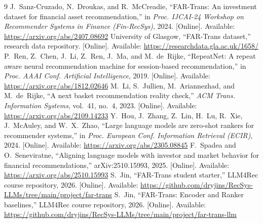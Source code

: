 \documentclass[conference]{IEEEtran}
\begin{document}
\begin{thebibliography}{9}
 J.~Sanz-Cruzado, N.~Droukas, and R.~McCreadie, ``FAR-Trans: An investment dataset for financial asset recommendation,'' in \emph{Proc. IJCAI-24 Workshop on Recommender Systems in Finance (Fin-RecSys)}, 2024. [Online]. Available: \url{https://arxiv.org/abs/2407.08692}
 University of Glasgow, ``FAR-Trans dataset,'' research data repository. [Online]. Available: \url{https://researchdata.gla.ac.uk/1658/}
 P.~Ren, Z.~Chen, J.~Li, Z.~Ren, J.~Ma, and M.~de~Rijke, ``RepeatNet: A repeat aware neural recommendation machine for session-based recommendation,'' in \emph{Proc. AAAI Conf. Artificial Intelligence}, 2019. [Online]. Available: \url{https://arxiv.org/abs/1812.02646}
 M.~Li, S.~Jullien, M.~Ariannezhad, and M.~de~Rijke, ``A next basket recommendation reality check,'' \emph{ACM Trans. Information Systems}, vol.~41, no.~4, 2023. [Online]. Available: \url{https://arxiv.org/abs/2109.14233}
 Y.~Hou, J.~Zhang, Z.~Lin, H.~Lu, R.~Xie, J.~McAuley, and W.~X.~Zhao, ``Large language models are zero-shot rankers for recommender systems,'' in \emph{Proc. European Conf. Information Retrieval (ECIR)}, 2024. [Online]. Available: \url{https://arxiv.org/abs/2305.08845}
 F.~Spadea and O.~Seneviratne, ``Aligning language models with investor and market behavior for financial recommendations,'' arXiv:2510.15993, 2025. [Online]. Available: \url{https://arxiv.org/abs/2510.15993}
 S.~Jin, ``FAR-Trans student starter,'' LLM4Rec course repository, 2026. [Online]. Available: \url{https://github.com/dryjins/RecSys-LLMs/tree/main/project/far-trans}
 S.~Jin, ``FAR-Trans: Encoder and Ranker baselines,'' LLM4Rec course repository, 2026. [Online]. Available: \url{https://github.com/dryjins/RecSys-LLMs/tree/main/project/far-trans-llm}
\end{thebibliography}
\end{document}
